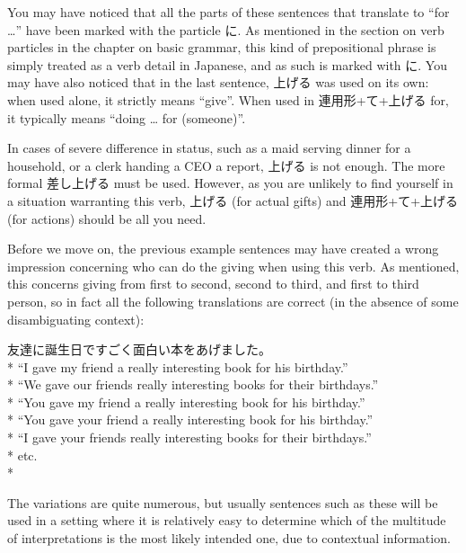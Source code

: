 \documentclass[11pt, b5paper, twoside, openright, onecolumn]{book}
\newenvironment{exampleblock}{
\setlength{\parindent}{0.6in}
\begin{minipage}[t]{\dimexpr\textwidth-\parindent}}
{\end{minipage}}
\begin{document}
You may have noticed that all the parts of these sentences that translate to “for …” have been marked with the particle に. As mentioned in the section on verb particles in the chapter on basic grammar‚ this kind of prepositional phrase is simply treated as a verb detail in Japanese‚ and as such is marked with に. You may have also noticed that in the last sentence‚ 上げる was used on its own: when used alone‚ it strictly means “give”. When used in 連用形+て+上げる for‚ it typically means “doing … for (someone)”.

In cases of severe difference in status‚ such as a maid serving dinner for a household‚ or a clerk handing a CEO a report‚ 上げる is not enough. The more formal 差し上げる must be used. However‚ as you are unlikely to find yourself in a situation warranting this verb‚ 上げる (for actual gifts) and 連用形+て+上げる (for actions) should be all you need.

Before we move on‚ the previous example sentences may have created a wrong impression concerning who can do the giving when using this verb. As mentioned‚ this concerns giving from first to second‚ second to third‚ and first to third person‚ so in fact all the following translations are correct (in the absence of some disambiguating context):

\vspace{0.4cm}
\begin{exampleblock}
友達に誕生日ですごく面白い本をあげました。 \\* 
“I gave my friend a really interesting book for his birthday.” \\* 
“We gave our friends really interesting books for their birthdays.” \\* 
“You gave my friend a really interesting book for his birthday.” \\* 
“You gave your friend a really interesting book for his birthday.” \\* 
“I gave your friends really interesting books for their birthdays.” \\* 
etc. \\* 
\end{exampleblock}
\vspace{0.2cm}

The variations are quite numerous‚ but usually sentences such as these will be used in a setting where it is relatively easy to determine which of the multitude of interpretations is the most likely intended one‚ due to contextual information.
\end{document}
